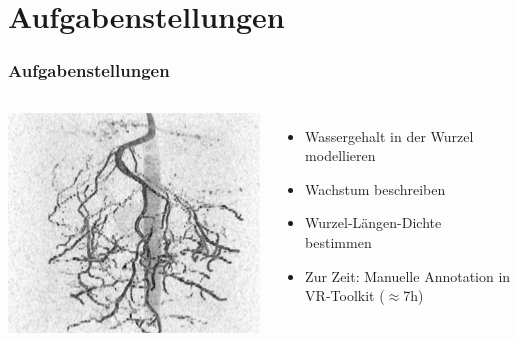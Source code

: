 \documentclass[final,ngerman,ignorenonframetext,compress]{beamer}
\begin{document}
\section{Aufgabenstellungen}

\begin{frame}
	\frametitle{Aufgabenstellungen}
	\begin{columns}
		\includegraphics[width=\linewidth]{img/raw-4.png}
		\begin{itemize}
			\item Wassergehalt in der Wurzel modellieren
			\item Wachstum beschreiben
			\item Wurzel-L\"angen-Dichte bestimmen
			\item<alert@2> Zur Zeit: Manuelle Annotation in VR-Toolkit ($\approx$7h)
		\end{itemize}
	\end{columns}
\end{frame}
\end{document}
